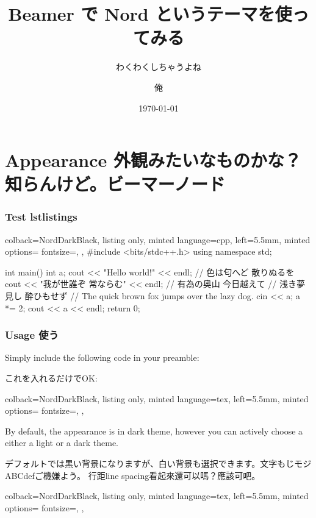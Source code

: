 \documentclass[compress]{beamer}
\title{Beamer で Nord というテーマを使ってみる}
\subtitle{わくわくしちゃうよね}
\author{俺}
\institute{京都大学}
\date{\today}
\begin{document}
\begin{frame}
	\maketitle
\end{frame}


\section{Appearance 外観みたいなものかな？知らんけど。ビーマーノード}

\begin{frame}[fragile]
	\frametitle{Test lstlistings}
    \begin{tcblisting}{
            colback=NordDarkBlack,
            listing only,
            minted language=cpp,
            left=5.5mm,
            minted options={
                fontsize=\footnotesize,
            },
        }
#include <bits/stdc++.h>
using namespace std;

int main() {
    int a;
    cout << "Hello world!" << endl;
    // 色は匂へど 散りぬるを
    cout << "我が世誰ぞ 常ならむ" << endl;
    // 有為の奥山 今日越えて
    // 浅き夢見し 酔ひもせず
    // The quick brown fox jumps over the lazy dog.
    cin << a;
    a *= 2;
    cout << a << endl;
    return 0;
}
\end{tcblisting}
\end{frame}


\begin{frame}[fragile]
	\frametitle{Usage 使う}
	Simply include the following code in your preamble:

	これを入れるだけでOK:

    \begin{tcblisting}{
            colback=NordDarkBlack,
            listing only,
            minted language=tex,
            left=5.5mm,
            minted options={
                fontsize=\footnotesize,
            },
        }
    \end{tcblisting}

	\bigskip

	By default, the appearance is in dark theme, however you can actively choose a either a light or a
	dark theme.

	デフォルトでは黒い背景になりますが、白い背景も選択できます。文字もじモジABCdefご機嫌よう。
    行距line spacing看起來還可以嗎？應該可吧。

    \begin{tcblisting}{
            colback=NordDarkBlack,
            listing only,
            minted language=tex,
            left=5.5mm,
            minted options={
                fontsize=\footnotesize,
            },
        }
\end{tcblisting}

\end{frame}
\end{document}
